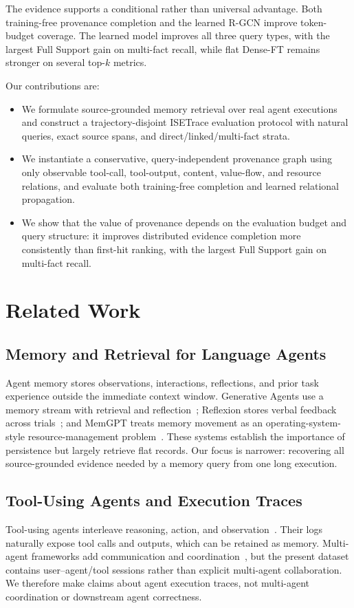 \documentclass[sigconf,anonymous,review]{acmart}
\begin{document}
The evidence supports a conditional rather than universal advantage. Both training-free provenance completion and the learned R-GCN improve token-budget coverage. The learned model improves all three query types, with the largest Full Support gain on multi-fact recall, while flat Dense-FT remains stronger on several top-$k$ metrics.

Our contributions are:
\begin{itemize}
    \item We formulate source-grounded memory retrieval over real agent executions and construct a trajectory-disjoint ISETrace evaluation protocol with natural queries, exact source spans, and direct/linked/multi-fact strata.
    \item We instantiate a conservative, query-independent provenance graph using only observable tool-call, tool-output, content, value-flow, and resource relations, and evaluate both training-free completion and learned relational propagation.
    \item We show that the value of provenance depends on the evaluation budget and query structure: it improves distributed evidence completion more consistently than first-hit ranking, with the largest Full Support gain on multi-fact recall.
\end{itemize}

\section{Related Work}

\subsection{Memory and Retrieval for Language Agents}
Agent memory stores observations, interactions, reflections, and prior task experience outside the immediate context window. Generative Agents use a memory stream with retrieval and reflection~\cite{park2023generative}; Reflexion stores verbal feedback across trials~\cite{shinn2023reflexion}; and MemGPT treats memory movement as an operating-system-style resource-management problem~\cite{packer2023memgpt}. These systems establish the importance of persistence but largely retrieve flat records. Our focus is narrower: recovering all source-grounded evidence needed by a memory query from one long execution.

\subsection{Tool-Using Agents and Execution Traces}
Tool-using agents interleave reasoning, action, and observation~\cite{yao2023react,schick2023toolformer,karpas2022mrkl}. Their logs naturally expose tool calls and outputs, which can be retained as memory. Multi-agent frameworks add communication and coordination~\cite{wu2023autogen,li2023camel}, but the present dataset contains user--agent/tool sessions rather than explicit multi-agent collaboration. We therefore make claims about agent execution traces, not multi-agent coordination or downstream agent correctness.
\end{document}
